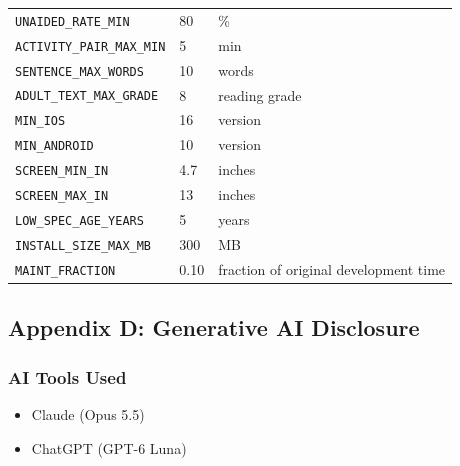 \documentclass[12pt]{article}
\begin{document}
\begin{longtable}{p{} p{} p{}}
\texttt{UNAIDED\_RATE\_MIN}
\label{const:UNAIDED_RATE_MIN}
& 80 & \%\\

\texttt{ACTIVITY\_PAIR\_MAX\_MIN}
\label{const:ACTIVITY_PAIR_MAX_MIN}
& 5 & min\\

\texttt{SENTENCE\_MAX\_WORDS}
\label{const:SENTENCE_MAX_WORDS}
& 10 & words\\

\texttt{ADULT\_TEXT\_MAX\_GRADE}
\label{const:ADULT_TEXT_MAX_GRADE}
& 8 & reading grade\\

\texttt{MIN\_IOS}
\label{const:MIN_IOS}
& 16 & version\\

\texttt{MIN\_ANDROID}
\label{const:MIN_ANDROID}
& 10 & version\\

\texttt{SCREEN\_MIN\_IN}
\label{const:SCREEN_MIN_IN}
& 4.7 & inches\\

\texttt{SCREEN\_MAX\_IN}
\label{const:SCREEN_MAX_IN}
& 13 & inches\\

\texttt{LOW\_SPEC\_AGE\_YEARS}
\label{const:LOW_SPEC_AGE_YEARS}
& 5 & years\\

\texttt{INSTALL\_SIZE\_MAX\_MB}
\label{const:INSTALL_SIZE_MAX_MB}
& 300 & MB\\

\texttt{MAINT\_FRACTION}
\label{const:MAINT_FRACTION}
& 0.10 & fraction of original development time\\

\end{longtable}

\subsection{Appendix D: Generative AI Disclosure}

\subsubsection*{AI Tools Used}

\begin{itemize}
    \item Claude (Opus 5.5)
    \item ChatGPT (GPT-6 Luna)
\end{itemize}
\end{document}
